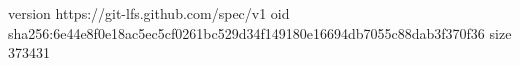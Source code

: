 version https://git-lfs.github.com/spec/v1
oid sha256:6e44e8f0e18ac5ec5cf0261bc529d34f149180e16694db7055c88dab3f370f36
size 373431
